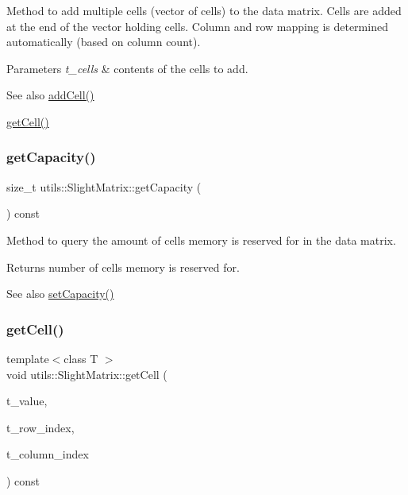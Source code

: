 Method to add multiple cells (vector of cells) to the data matrix. Cells are added at the end of the vector holding cells. Column and row mapping is determined automatically (based on column count). 
\begin{DoxyParams}{Parameters}
{\em t\+\_\+cells} & contents of the cells to add. \\
\hline
\end{DoxyParams}
\begin{DoxySeeAlso}{See also}
\hyperlink{classutils_1_1SlightMatrix_a06f6b4d49818f6f1befea6109ad7b5f6}{add\+Cell()} 

\hyperlink{classutils_1_1SlightMatrix_ae611736cad271a84df5ec2f8d4fca50d}{get\+Cell()} 
\end{DoxySeeAlso}
\mbox{\label{classutils_1_1SlightMatrix_addbfd1ec641100a7cda0b4f6e39ae676}} 
\subsubsection{\texorpdfstring{get\+Capacity()}{getCapacity()}}
{\footnotesize\ttfamily size\+\_\+t utils\+::\+Slight\+Matrix\+::get\+Capacity (\begin{DoxyParamCaption}\item[{void}]{ }\end{DoxyParamCaption}) const}

Method to query the amount of cells memory is reserved for in the data matrix. \begin{DoxyReturn}{Returns}
number of cells memory is reserved for. 
\end{DoxyReturn}
\begin{DoxySeeAlso}{See also}
\hyperlink{classutils_1_1SlightMatrix_a60585fa6bfe89f8fb2e477f6811c6741}{set\+Capacity()} 
\end{DoxySeeAlso}
\mbox{\label{classutils_1_1SlightMatrix_ae611736cad271a84df5ec2f8d4fca50d}} 
\subsubsection{\texorpdfstring{get\+Cell()}{getCell()}}
{\footnotesize\ttfamily template$<$class T $>$ \\
void utils\+::\+Slight\+Matrix\+::get\+Cell (\begin{DoxyParamCaption}\item[{T \&}]{t\+\_\+value,  }\item[{size\+\_\+t}]{t\+\_\+row\+\_\+index,  }\item[{size\+\_\+t}]{t\+\_\+column\+\_\+index }\end{DoxyParamCaption}) const}

